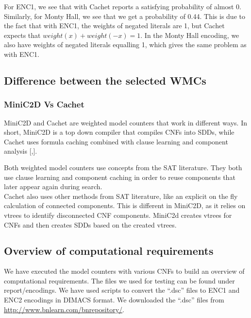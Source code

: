 For ENC1, we see that with Cachet reports a satisfying probability of almost 0. Similarly, for Monty Hall, we see that we get a probability of 0.44. This is due to the fact that with ENC1, the weights of negated literals are 1, but Cachet expects that $weight(x) + weight(-x) = 1$. In the Monty Hall encoding, we also have weights of negated literals equalling 1, which gives the same problem as with ENC1.

\subsection{Difference between the selected WMCs}

\subsubsection{MiniC2D Vs Cachet}
MiniC2D and Cachet are weighted model counters that work in different ways. In short, MiniC2D is a top down compiler that compiles CNFs into SDDs, while Cachet uses formula caching combined with clause learning and component analysis [\cite{MiniC2D},\cite{Cachet}].

Both weighted model counters use concepts from the SAT literature. They both use clause learning and component caching in order to reuse components that later appear again during search. \\
Cachet also uses other methods from SAT literature, like an explicit on the fly calculation of connected components. This is different in MiniC2D, as it relies on vtrees to identify disconnected CNF components. MiniC2d creates vtrees for CNFs and then creates SDDs based on the created vtrees.


\subsection{Overview of computational requirements}
We have executed the model counters with various CNFs to build an overview of computational requirements. The files we used for testing can be found under report/encodings. We have used scripts to convert the ``.dsc'' files to ENC1 and ENC2 encodings in DIMACS format. We downloaded the ``.dsc'' files from \url{http://www.bnlearn.com/bnrepository/}.

